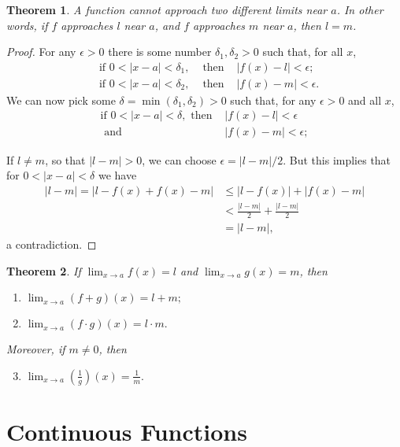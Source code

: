 \documentclass{article}
\numberwithin{corollary}{subsection}
\numberwithin{definition}{subsection}
\numberwithin{lemma}{subsection}
\newtheorem{theorem}{Theorem}
\numberwithin{theorem}{subsection}
\begin{document}
\begin{theorem}
  A function cannot approach two different limits near $a$. In other words, if
  $f$ approaches $l$ near $a$, and $f$ approaches $m$ near $a$, then $l = m$.
\end{theorem}
\begin{proof}
  For any $\epsilon > 0$ there is some number $\delta_1, \delta_2 > 0$ such
  that, for all $x$,
  \begin{align*}
    &\text{if } 0 < |x - a| < \delta_1, &\text{ then } &|f(x) - l| < \epsilon;
    \\
    &\text{if } 0 < |x - a| < \delta_2, &\text{ then } &|f(x) - m| < \epsilon.
  \end{align*}
  We can now pick some $\delta = \min(\delta_1, \delta_2) > 0$ such that, for
  any $\epsilon > 0$ and all $x$,
  \begin{align*}
    \text{if } 0 < |x - a| < \delta,
    \text{ then } &|f(x) - l| < \epsilon \\
    \text{ and } &|f(x) - m| < \epsilon;
  \end{align*}

  If $l \neq m$, so that $|l - m| > 0$, we can choose $\epsilon = |l - m|/2$.
  But this implies that for $0 < |x - a| < \delta$ we have
  \begin{align*}
    |l - m| = |l - f(x) + f(x) - m|
    &\leq |l - f(x)| + |f(x) - m| \\
    &< \frac{|l - m|}{2} + \frac{|l - m|}{2} \\
    &= |l - m|,
  \end{align*}
  a contradiction.
\end{proof}

\begin{theorem}
  If $\lim_{x \to a}f(x) = l$ and $\lim_{x \to a}g(x) = m$, then
  \begin{enumerate}
    \item $\lim_{x \to a}(f + g)(x) = l + m;$
    \item $\lim_{x \to a}(f \cdot g)(x) = l \cdot m.$
  \end{enumerate}
  Moreover, if $m \neq 0$, then
  \begin{enumerate}
    \setcounter{enumi}{2}
    \item $\lim_{x \to a}\left(\frac{1}{g}\right)(x) = \frac{1}{m}.$
  \end{enumerate}
\end{theorem}

\section{Continuous Functions}
\end{document}
